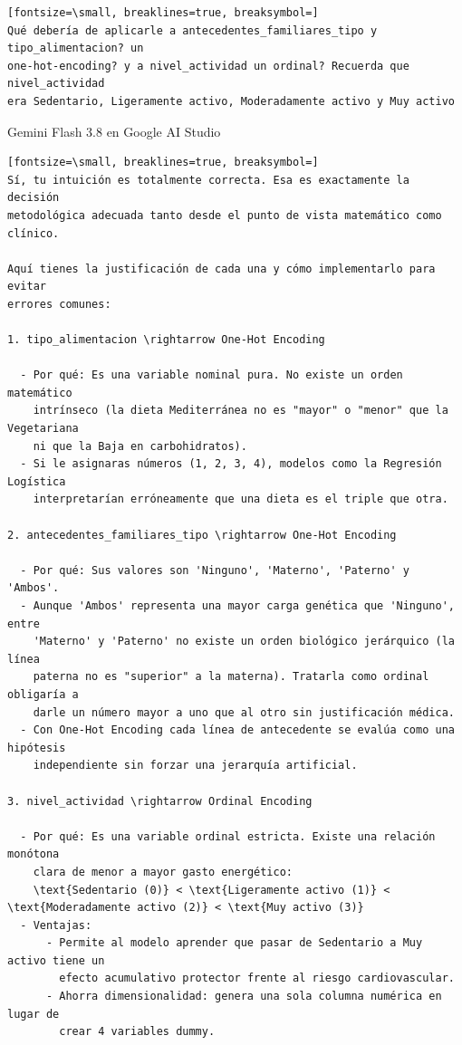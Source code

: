 \documentclass[12pt,a4paper,oneside]{book}
\begin{document}
\begin{iaprompt}
\begin{Verbatim}[fontsize=\small, breaklines=true, breaksymbol=]
Qué debería de aplicarle a antecedentes_familiares_tipo y tipo_alimentacion? un
one-hot-encoding? y a nivel_actividad un ordinal? Recuerda que nivel_actividad
era Sedentario, Ligeramente activo, Moderadamente activo y Muy activo
\end{Verbatim}
\end{iaprompt}
\begin{iaresp}{Gemini Flash 3.8 en Google AI Studio}
\begin{Verbatim}[fontsize=\small, breaklines=true, breaksymbol=]
Sí, tu intuición es totalmente correcta. Esa es exactamente la decisión
metodológica adecuada tanto desde el punto de vista matemático como clínico.

Aquí tienes la justificación de cada una y cómo implementarlo para evitar
errores comunes:

1. tipo_alimentacion \rightarrow One-Hot Encoding

  - Por qué: Es una variable nominal pura. No existe un orden matemático
    intrínseco (la dieta Mediterránea no es "mayor" o "menor" que la Vegetariana
    ni que la Baja en carbohidratos).
  - Si le asignaras números (1, 2, 3, 4), modelos como la Regresión Logística
    interpretarían erróneamente que una dieta es el triple que otra.

2. antecedentes_familiares_tipo \rightarrow One-Hot Encoding

  - Por qué: Sus valores son 'Ninguno', 'Materno', 'Paterno' y 'Ambos'.
  - Aunque 'Ambos' representa una mayor carga genética que 'Ninguno', entre
    'Materno' y 'Paterno' no existe un orden biológico jerárquico (la línea
    paterna no es "superior" a la materna). Tratarla como ordinal obligaría a
    darle un número mayor a uno que al otro sin justificación médica.
  - Con One-Hot Encoding cada línea de antecedente se evalúa como una hipótesis
    independiente sin forzar una jerarquía artificial.

3. nivel_actividad \rightarrow Ordinal Encoding

  - Por qué: Es una variable ordinal estricta. Existe una relación monótona
    clara de menor a mayor gasto energético:
    \text{Sedentario (0)} < \text{Ligeramente activo (1)} < \text{Moderadamente activo (2)} < \text{Muy activo (3)}
  - Ventajas:
      - Permite al modelo aprender que pasar de Sedentario a Muy activo tiene un
        efecto acumulativo protector frente al riesgo cardiovascular.
      - Ahorra dimensionalidad: genera una sola columna numérica en lugar de
        crear 4 variables dummy.


\end{Verbatim}
\end{iaresp}
\end{document}
